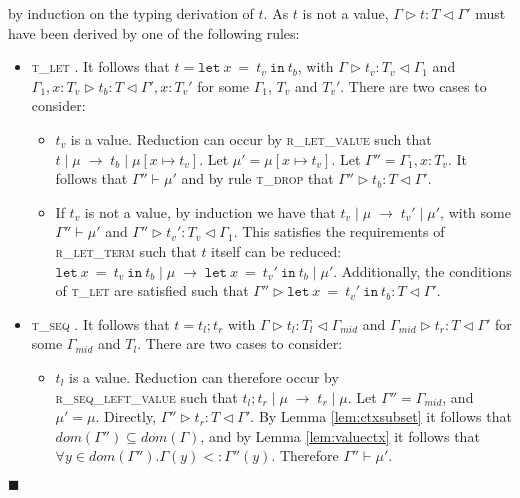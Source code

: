 \documentclass[preprint]{sigplanconf}
\newcommand{\lemref}[1]{Lemma \ref{#1}}
\newcommand{\rlett}{\textsc{r\_let\_term} }
\newcommand{\rletv}{\textsc{r\_let\_value} }
\newcommand{\rseqlv}{\textsc{r\_seq\_left\_value} }
\newcommand{\tlet}{\textsc{t\_let} }
\newcommand{\tseq}{\textsc{t\_seq} }
\newcommand{\tdrop}{\textsc{t\_drop} }
\newcommand{\typerule}[4]{#1 \triangleright #2 : #3 \triangleleft #4}
\newcommand{\oprule}[4]{#1 \mid #2\;\longrightarrow\;#3 \mid #4}
\newcommand{\lett}[3]{\mathtt{let}\:#1\:\mathtt{=}\:#2\:\mathtt{in}\:#3}
\newcommand{\qed}{$\blacksquare$}
\newenvironment{proof}{\vspace{1ex}\noindent{\bf Proof}\hspace{0.5em}}
  {\hfill\qed\vspace{1ex}}
\begin{document}
\begin{proof}
by induction on the typing derivation of $t$. As $t$ is not a value,
$\typerule{\Gamma}{t}{T}{\Gamma'}$ must have been derived by one of the
following rules:

\begin{itemize}
\item \tlet. It follows that $t = \lett{x}{t_v}{t_b}$, with
$\typerule{\Gamma}{t_v}{T_v}{\Gamma_1}$ and
$\typerule{\Gamma_1, x : T_v}{t_b}{T}{\Gamma', x : T_v'}$ for some
$\Gamma_1$, $T_v$ and $T_v'$.
There are two cases to consider:

  \begin{itemize}
  \item $t_v$ is a value.
  Reduction can occur by \rletv such that 
  $\oprule{t}{\mu}{t_b}{\mu [ x \mapsto t_v ]}$.
  Let $\mu' = \mu [ x \mapsto t_v ]$. Let $\Gamma'' = \Gamma_1, x : T_v$.
  It follows that $\Gamma'' \vdash \mu'$ and by rule \tdrop that
  $\typerule{\Gamma''}{t_b}{T}{\Gamma'}$.

  \item If $t_v$ is not a value, 
  by induction we have that $\oprule{t_v}{\mu}{t_v'}{\mu'}$, with
  some $\Gamma'' \vdash \mu'$ and $\typerule{\Gamma''}{t_v'}{T_v}{\Gamma_1}$.
  This satisfies the requirements of \rlett such that $t$ itself can be reduced:
  $\oprule{\lett{x}{t_v}{t_b}}{\mu}{\lett{x}{t_v'}{t_b}}{\mu'}$.
  Additionally, the conditions of \tlet are satisfied such that
  $\typerule{\Gamma''}{\lett{x}{t_v'}{t_b}}{T}{\Gamma'}$.

  \end{itemize}

\item \tseq. It follows that $t = t_l ; t_r$ with
$\typerule{\Gamma}{t_l}{T_l}{\Gamma_{mid}}$ and
$\typerule{\Gamma_{mid}}{t_r}{T}{\Gamma'}$ for some $\Gamma_{mid}$ and $T_l$.
There are two cases to consider:

  \begin{itemize}
  \item $t_l$ is a value. Reduction can therefore occur by \\
  \rseqlv such that
  $\oprule{t_l ; t_r}{\mu}{t_r}{\mu}$. 
  Let $\Gamma'' = \Gamma_{mid}$, and $\mu' = \mu$.
  Directly, $\typerule{\Gamma''}{t_r}{T}{\Gamma'}$.
  By \lemref{lem:ctxsubset} it follows that $dom(\Gamma'') \subseteq dom(\Gamma)$,
  and by \lemref{lem:valuectx} it follows that 
  $\forall y \in dom(\Gamma'') . \Gamma(y) <: \Gamma''(y)$.
  Therefore $\Gamma'' \vdash \mu'$.


\end{itemize}
\end{itemize}
\end{proof}
\end{document}

